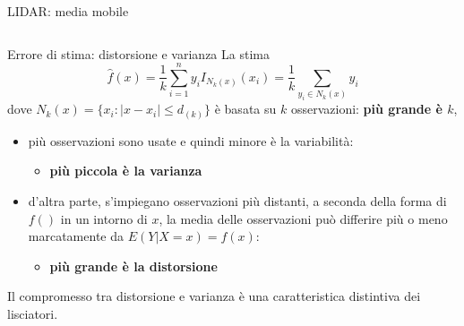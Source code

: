 \documentclass{beamer}\usepackage[]{graphicx}\usepackage[]{color}
\begin{document}
\begin{frame}[t]{LIDAR: media mobile}
\begin{columns}[T]
{}

\end{columns}

\end{frame}




\begin{frame}{Errore di stima: distorsione e varianza}
La stima
\[ \hat{f}(x) = \frac{1}{k} \sum_{i=1}^n y_i I_{N_k(x)}(x_i)  
= \frac{1}{k} \sum_{y_i\in N_k(x)} y_i  \]
dove $N_k(x)=\{x_i: |x-x_i|\leq d_{(k)}\}$ \`e basata su  $k$ osservazioni: {\bf pi\`u grande \`e $k$}, 
\begin{itemize}
\item pi\`u osservazioni sono usate e quindi minore \`e la variabilit\`a:
\begin{itemize}
\item<2>  {\bf pi\`u piccola \`e la  varianza}
\end{itemize}
\item d'altra parte, s'impiegano osservazioni pi\`u distanti, a seconda della forma di $f()$ in un intorno di $x$, la media delle osservazioni pu\`o differire pi\`u o meno marcatamente da $E(Y|X=x)=f(x)$:
\begin{itemize}
\item<2>  {\bf pi\`u grande \`e la distorsione}
\end{itemize}
\end{itemize}
Il compromesso tra distorsione e varianza \`e una caratteristica distintiva dei lisciatori.
\end{frame}
\end{document}
